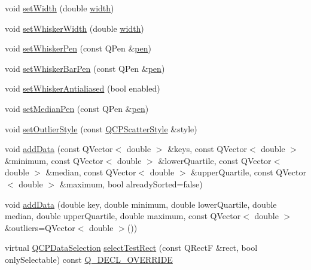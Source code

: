 \begin{DoxyCompactItemize}
\item 
void \hyperlink{class_q_c_p_statistical_box_a0b62775bd67301b1eba5c785f2b26f14}{set\+Width} (double \hyperlink{class_q_c_p_statistical_box_ae589b7481dec6ef8e50ebb6492d296f1}{width})
\item 
void \hyperlink{class_q_c_p_statistical_box_adf378812446bd66f34d1f7f293d991cd}{set\+Whisker\+Width} (double \hyperlink{class_q_c_p_statistical_box_ae589b7481dec6ef8e50ebb6492d296f1}{width})
\item 
void \hyperlink{class_q_c_p_statistical_box_a4a5034cb3b9b040444df05ab1684620b}{set\+Whisker\+Pen} (const Q\+Pen \&\hyperlink{class_q_c_p_abstract_plottable_ad5972efc31344e5a7a78ab4f8864b2d3}{pen})
\item 
void \hyperlink{class_q_c_p_statistical_box_aa8d3e503897788e1abf68dc74b5f147f}{set\+Whisker\+Bar\+Pen} (const Q\+Pen \&\hyperlink{class_q_c_p_abstract_plottable_ad5972efc31344e5a7a78ab4f8864b2d3}{pen})
\item 
void \hyperlink{class_q_c_p_statistical_box_a61bcd458fba002f72304d11319051843}{set\+Whisker\+Antialiased} (bool enabled)
\item 
void \hyperlink{class_q_c_p_statistical_box_a7260ac55b669f5d0a74f16d5ca84c52c}{set\+Median\+Pen} (const Q\+Pen \&\hyperlink{class_q_c_p_abstract_plottable_ad5972efc31344e5a7a78ab4f8864b2d3}{pen})
\item 
void \hyperlink{class_q_c_p_statistical_box_ad5241943422eb8e58360a97e99ad6aa7}{set\+Outlier\+Style} (const \hyperlink{class_q_c_p_scatter_style}{Q\+C\+P\+Scatter\+Style} \&style)
\item 
void \hyperlink{class_q_c_p_statistical_box_a9a8739c5b8291db8fd839e892fc8f478}{add\+Data} (const Q\+Vector$<$ double $>$ \&keys, const Q\+Vector$<$ double $>$ \&minimum, const Q\+Vector$<$ double $>$ \&lower\+Quartile, const Q\+Vector$<$ double $>$ \&median, const Q\+Vector$<$ double $>$ \&upper\+Quartile, const Q\+Vector$<$ double $>$ \&maximum, bool already\+Sorted=false)
\item 
void \hyperlink{class_q_c_p_statistical_box_a026f2790b530d6f29312254ecb1e7c1e}{add\+Data} (double key, double minimum, double lower\+Quartile, double median, double upper\+Quartile, double maximum, const Q\+Vector$<$ double $>$ \&outliers=Q\+Vector$<$ double $>$())
\item 
virtual \hyperlink{class_q_c_p_data_selection}{Q\+C\+P\+Data\+Selection} \hyperlink{class_q_c_p_statistical_box_a42febad6ad5e924a151434cc434b4ffc}{select\+Test\+Rect} (const Q\+RectF \&rect, bool only\+Selectable) const \hyperlink{qcustomplot_8h_a42cc5eaeb25b85f8b52d2a4b94c56f55}{Q\+\_\+\+D\+E\+C\+L\+\_\+\+O\+V\+E\+R\+R\+I\+DE}

\end{DoxyCompactItemize}
